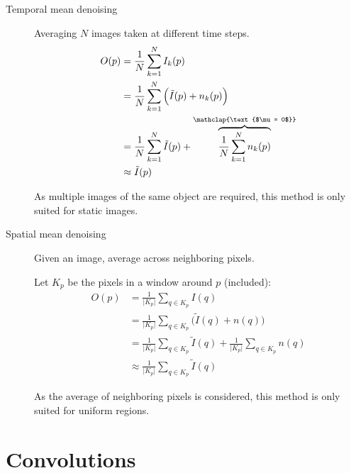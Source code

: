 \begin{description}
    \item[Temporal mean denoising] 
        Averaging $N$ images taken at different time steps.
        \[ 
            \begin{split}
                O(p) &= \frac{1}{N} \sum_{k=1}^{N} I_k(p) \\
                    &= \frac{1}{N} \sum_{k=1}^{N} \Big( \tilde{I}(p) + n_k(p) \Big) \\
                    &= \frac{1}{N} \sum_{k=1}^{N} \tilde{I}(p) + \overbrace{\frac{1}{N} \sum_{k=1}^{N} n_k(p)}^{\mathclap{\text{$\mu = 0$}}} \\
                    &\approx \tilde{I}(p)
            \end{split}
        \]

        \begin{remark}
            As multiple images of the same object are required, this method is only suited for static images.
        \end{remark}

    \item[Spatial mean denoising] 
        Given an image, average across neighboring pixels.

        Let $K_p$ be the pixels in a window around $p$ (included):
        \[ 
            \begin{split}
                O(p) &= \frac{1}{\vert K_p \vert} \sum_{q \in K_p} I(q) \\
                    &= \frac{1}{\vert K_p \vert} \sum_{q \in K_p} \Big( \tilde{I}(q) + n(q) \Big) \\
                    &= \frac{1}{\vert K_p \vert} \sum_{q \in K_p} \tilde{I}(q) + \frac{1}{\vert K_p \vert} \sum_{q \in K_p} n(q) \\
                    &\approx \frac{1}{\vert K_p \vert} \sum_{q \in K_p} \tilde{I}(q)
            \end{split}
        \]

        \begin{remark}
            As the average of neighboring pixels is considered, this method is only suited for uniform regions.
        \end{remark}
\end{description}



\section{Convolutions}


